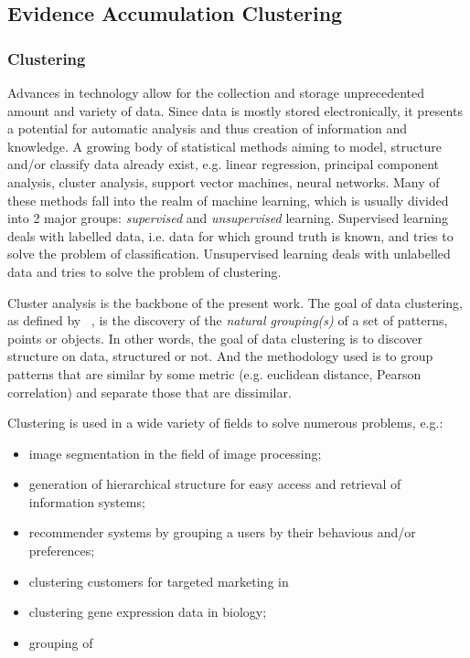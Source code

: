 \subsection{Evidence Accumulation Clustering}

\subsubsection{Clustering}
\label{sec:clustering}

Advances in technology allow for the collection and storage unprecedented amount and variety of data. Since data is mostly stored electronically, it presents a potential for automatic analysis and thus creation of information and knowledge. A growing body of statistical methods aiming to model, structure and/or classify data already exist, e.g. linear regression, principal component analysis, cluster analysis, support vector machines, neural networks. Many of these methods fall into the realm of machine learning, which is usually divided into 2 major groups: \textit{supervised} and \textit{unsupervised} learning.
Supervised learning deals with labelled data, i.e. data for which ground truth is known, and tries to solve the problem of classification. Unsupervised learning deals with unlabelled data and tries to solve the problem of clustering.

Cluster analysis is the backbone of the present work.
The goal of data clustering, as defined by ~\cite{Jain2010}, is the discovery of the \textit{natural grouping(s)} of a set of patterns, points or objects. In other words, the goal of data clustering is to discover structure on data, structured or not.
And the methodology used is to group patterns that are similar by some metric (e.g. euclidean distance, Pearson correlation) and separate those that are dissimilar. %

Clustering is used in a wide variety of fields to solve numerous problems, e.g.:
\begin{itemize}
\item image segmentation in the field of image processing;
\item generation of hierarchical structure for easy access and retrieval of information systems;
\item recommender systems by grouping a users by their behavious and/or preferences;
\item clustering customers for targeted marketing in 
\item clustering gene expression data in biology;
\item grouping of 
\end{itemize}



